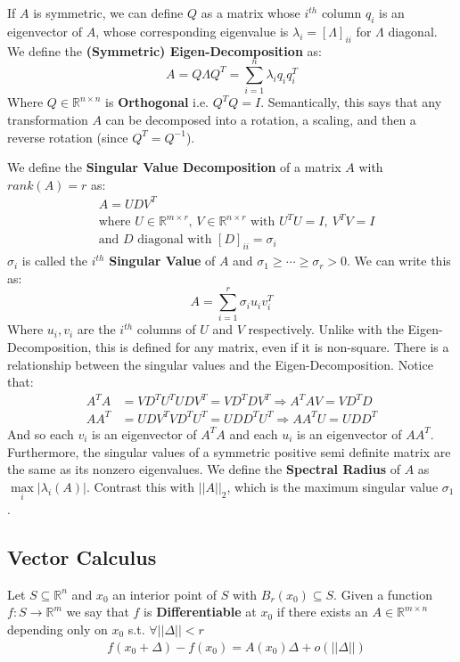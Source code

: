 \documentclass[]{article}
\theoremstyle{mattstyle}
\theoremstyle{definition}
\begin{document}
If $A$ is symmetric, we can define $Q$ as a matrix whose $i^{th}$ column $q_i$ is an eigenvector of $A$, whose corresponding eigenvalue is $\lambda_i = [\Lambda]_{ii}$ for $\Lambda$ diagonal. We define the \textbf{(Symmetric) Eigen-Decomposition} as:
$$A = Q\Lambda Q^T = \sum_{i=1}^n \lambda_i q_i q_i^T$$
Where $Q\in\mathbb{R}^{n \times n}$ is \textbf{Orthogonal} i.e. $Q^TQ=I$. Semantically, this says that any transformation $A$ can be decomposed into a rotation, a scaling, and then a reverse rotation (since $Q^T=Q^{-1}$).

\newpage

We define the \textbf{Singular Value Decomposition} of a matrix $A$ with $rank(A)=r$ as:
\begin{align*}
&A=UDV^T\\
&\text{where $U\in\mathbb{R}^{m \times r}$, $V\in\mathbb{R}^{n \times r}$ with } U^TU=I, \ V^TV=I\\
&\text{and $D$ diagonal with $[D]_{ii}=\sigma_i$}
\end{align*}
$\sigma_i$ is called the $i^{th}$ \textbf{Singular Value} of $A$ and $\sigma_1 \ge \cdots \ge \sigma_r > 0$. We can write this as:
$$A = \sum_{i=1}^r \sigma_i u_iv_i^T$$
Where $u_i, v_i$ are the $i^{th}$ columns of $U$ and $V$ respectively. 
Unlike with the Eigen-Decomposition, this is defined for any matrix, even if it is non-square. There is a relationship between the singular values and the Eigen-Decomposition. Notice that:
\begin{align*}
A^TA &= VD^TU^TUDV^T=VD^TDV^T \Rightarrow A^TAV = VD^TD\\
AA^T &= UDV^TVD^TU^T=UDD^TU^T \Rightarrow AA^TU = UDD^T
\end{align*}
And so each $v_i$ is an eigenvector of $A^TA$ and each $u_i$ is an eigenvector of $AA^T$. Furthermore, the singular values of a symmetric positive semi definite matrix are the same as its nonzero eigenvalues. We define the \textbf{Spectral Radius} of $A$ as $\max\limits_{i} |\lambda_i(A)|$. Contrast this with $||A||_2$, which is the maximum singular value $\sigma_1$.

\newpage

\subsection{Vector Calculus}

Let $S \subseteq \mathbb{R}^n$ and $x_0$ an interior point of $S$ with $B_r(x_0) \subseteq S$. Given a function $f: S \rightarrow \mathbb{R}^m$ we say that $f$ is \textbf{Differentiable} at $x_0$ if there exists an $A \in \mathbb{R}^{m \times n}$ depending only on $x_0$ s.t. $\forall ||\Delta|| < r$
\begin{align*}
&f(x_0 + \Delta) - f(x_0) = A(x_0)\Delta + o(||\Delta||)\\
\end{align*}
\end{document}
